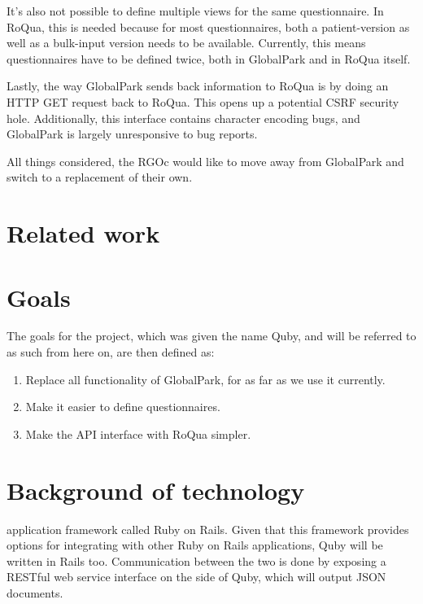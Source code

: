 \documentclass[10pt,fleqn,a4paper]{article}
\begin{document}
\begin{twocolumn}
It's also not possible to define multiple views for the same
questionnaire. In RoQua, this is needed because for most
questionnaires, both a patient-version as well as a bulk-input version
needs to be available. Currently, this means questionnaires have to be
defined twice, both in GlobalPark and in RoQua itself.

Lastly, the way GlobalPark sends back information to RoQua is by doing
an HTTP GET request back to RoQua. This opens up a potential CSRF
security hole. Additionally, this interface contains character
encoding bugs, and GlobalPark is largely unresponsive to bug reports.

All things considered, the RGOc would like to move away from
GlobalPark and switch to a replacement of their own.

\section{Related work}


\section{Goals}

The goals for the project, which was given the name Quby, and will be
referred to as such from here on, are then defined as:

\begin{enumerate}
\item Replace all functionality of GlobalPark, for as far as we use it
  currently.
\item \label{dsl} Make it easier to define questionnaires.
\item \label{restful} Make the API interface with RoQua simpler.
\end{enumerate}


\section{Background of technology}
application framework called Ruby on Rails. Given that this framework
provides options for integrating with other Ruby on Rails
applications, Quby will be written in Rails too. Communication between
the two is done by exposing a RESTful web service interface on the
side of Quby, which will output JSON documents.



\end{twocolumn}
\end{document}
